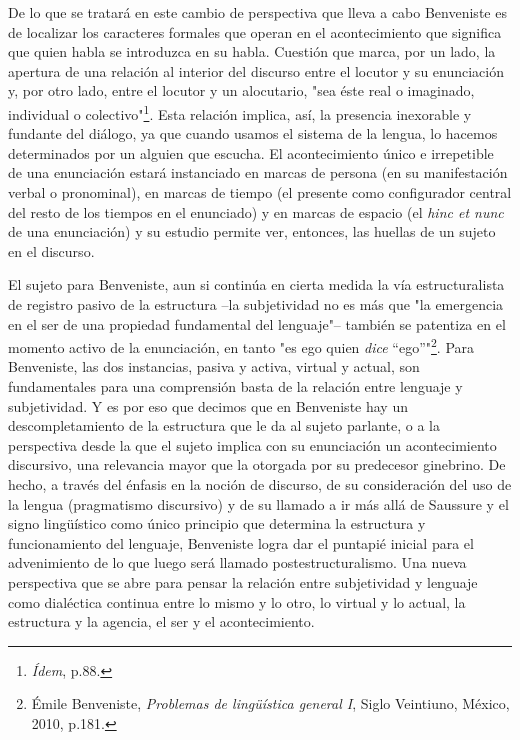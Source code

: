 De lo que se tratará en este cambio de perspectiva que lleva a cabo
Benveniste es de localizar los caracteres formales que operan en el
acontecimiento que significa que quien habla se introduzca en su habla.
Cuestión que marca, por un lado, la apertura de una relación al interior
del discurso entre el locutor y su enunciación y, por otro lado, entre
el locutor y un alocutario, "sea éste real o imaginado, individual o
colectivo"\footnote{\emph{Ídem}, p.88.}. Esta relación implica, así, la
presencia inexorable y fundante del diálogo, ya que cuando usamos el
sistema de la lengua, lo hacemos determinados por un alguien que
escucha. El acontecimiento único e irrepetible de una enunciación estará
instanciado en marcas de persona (en su manifestación verbal o
pronominal), en marcas de tiempo (el presente como configurador central
del resto de los tiempos en el enunciado) y en marcas de espacio (el
\emph{hinc et nunc} de una enunciación) y su estudio permite ver,
entonces, las huellas de un sujeto en el discurso.

El sujeto para Benveniste, aun si continúa en cierta medida la vía
estructuralista de registro pasivo de la estructura --la subjetividad no
es más que "la emergencia en el ser de una propiedad fundamental del
lenguaje"-- también se patentiza en el momento activo de la enunciación,
en tanto "es ego quien \emph{dice} ``ego''"\footnote{Émile Benveniste,
  \emph{Problemas de lingüística general I}, Siglo Veintiuno, México,
  2010, p.181.}. Para Benveniste, las dos instancias, pasiva y activa,
virtual y actual, son fundamentales para una comprensión basta de la
relación entre lenguaje y subjetividad. Y es por eso que decimos que en
Benveniste hay un descompletamiento de la estructura que le da al sujeto
parlante, o a la perspectiva desde la que el sujeto implica con su
enunciación un acontecimiento discursivo, una relevancia mayor que la
otorgada por su predecesor ginebrino. De hecho, a través del énfasis en
la noción de discurso, de su consideración del uso de la lengua
(pragmatismo discursivo) y de su llamado a ir más allá de Saussure y el
signo lingüístico como único principio que determina la estructura y
funcionamiento del lenguaje, Benveniste logra dar el puntapié inicial
para el advenimiento de lo que luego será llamado postestructuralismo.
Una nueva perspectiva que se abre para pensar la relación entre
subjetividad y lenguaje como dialéctica continua entre lo mismo y lo
otro, lo virtual y lo actual, la estructura y la agencia, el ser y el
acontecimiento.

